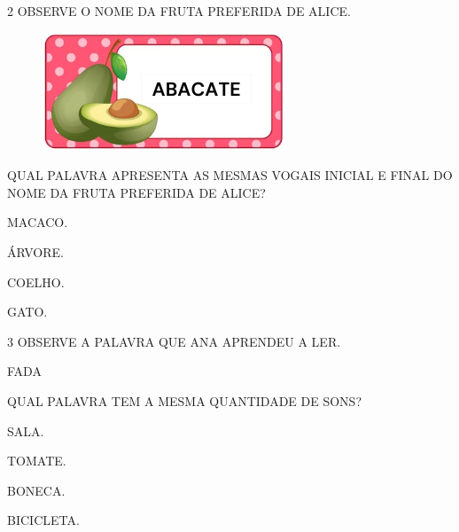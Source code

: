 \num{2} OBSERVE O NOME DA FRUTA PREFERIDA DE ALICE.

\begin{minipage}{.5\textwidth}
\begin{figure}[H]
\centering
\includegraphics[width=\textwidth]{media/image212.png}
\end{figure}
\end{minipage}
\hspace{0.5cm}
\begin{minipage}{.5\textwidth}
QUAL PALAVRA APRESENTA AS MESMAS VOGAIS INICIAL E FINAL DO NOME DA FRUTA PREFERIDA DE ALICE?
\end{minipage}

\vspace{0.5cm}

\begin{multicols}{2}
\begin{escolha}[itemsep=0pt]
\item MACACO.

\item ÁRVORE.

\item COELHO.

\item GATO.
\end{escolha}
\end{multicols}

\pagebreak

\num{3} OBSERVE A PALAVRA QUE ANA APRENDEU A LER.

\begin{myquote}
\centering\large{FADA}
\end{myquote}

QUAL PALAVRA TEM A MESMA QUANTIDADE DE SONS?

\begin{multicols}{2}
\begin{escolha}[itemsep=0pt]
\item SALA.

\item TOMATE.

\item BONECA.

\item BICICLETA.
\end{escolha}
\end{multicols}

